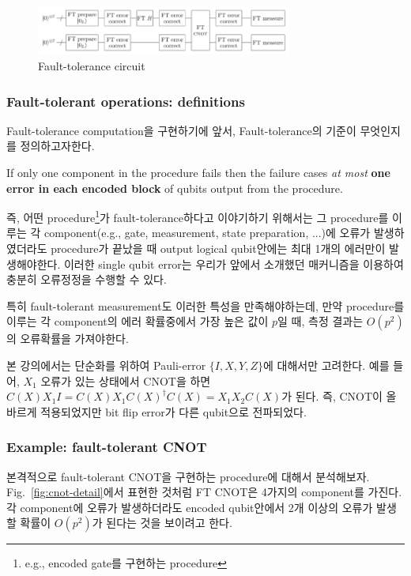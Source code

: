 \begin{figure}[h]
    \centering
    \includegraphics[width=0.75\textwidth]{figures/C7_FT_gate.png}
    \caption{Fault-tolerance circuit}
    \label{fig:FT-circui}
\end{figure}

\subsubsection{Fault-tolerant operations: definitions}
Fault-tolerance computation을 구현하기에 앞서, Fault-tolerance의 기준이 무엇인지를 정의하고자한다.
\begin{definition}
    If only one component in the procedure fails then the failure cases \textit{at most} \textbf{one error in each encoded block} of qubits output from the procedure.
\end{definition}
즉, 어떤 procedure\footnote{e.g., encoded gate를 구현하는 procedure}가 fault-tolerance하다고 이야기하기 위해서는 그 procedure를 이루는 각 component(e.g., gate, measurement, state preparation, ...)에 오류가 발생하였더라도 procedure가 끝났을 때 output logical qubit안에는 최대 1개의 에러만이 발생해야한다. 이러한 single qubit error는 우리가 앞에서 소개했던 매커니즘을 이용하여 충분히 오류정정을 수행할 수 있다.

특히 fault-tolerant measurement도 이러한 특성을 만족해야하는데, 만약 procedure를 이루는 각 component의 에러 확률중에서 가장 높은 값이 $p$일 때, 측정 결과는 $O(p^2)$의 오류확률을 가져야한다. 

본 강의에서는 단순화를 위하여 Pauli-error $\{I, X, Y, Z\}$에 대해서만 고려한다. 예를 들어, $X_1$ 오류가 있는 상태에서 CNOT을 하면 $C(X)X_1I = C(X)X_1C(X)^\dagger C(X) = X_1X_2C(X)$가 된다. 즉, CNOT이 올바르게 적용되었지만 bit flip error가 다른 qubit으로 전파되었다.

\subsubsection{Example: fault-tolerant CNOT}
본격적으로 fault-tolerant CNOT을 구현하는 procedure에 대해서 분석해보자. Fig.~\ref{fig:cnot-detail}에서 표현한 것처럼 FT CNOT은 4가지의 component를 가진다. 각 component에 오류가 발생하더라도 encoded qubit안에서 2개 이상의 오류가 발생할 확률이 $O(p^2)$가 된다는 것을 보이려고 한다. 

